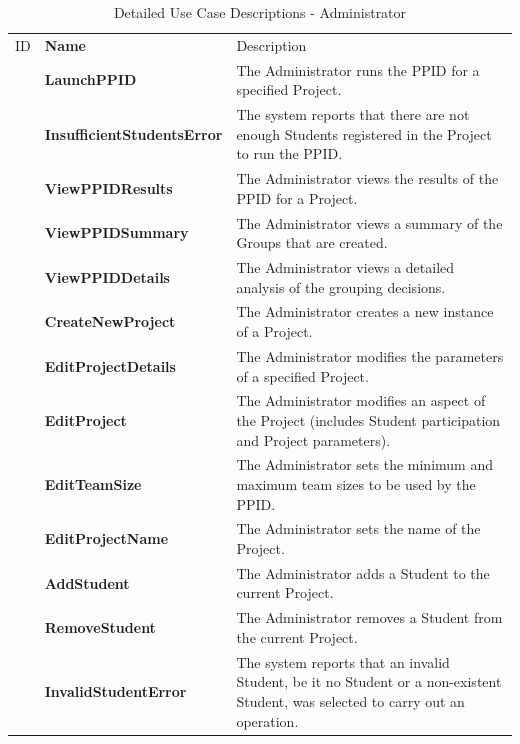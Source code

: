 \documentclass[12pt,letterpaper]{article}
\begin{document}
\begin{table}[H]
	\caption{Detailed Use Case Descriptions - Administrator}
	\vspace{1em}
	\begin{tabu} to 
	    \tableheader{}ID & Name & Description\\
		& LaunchPPID & The Administrator runs the PPID for a specified Project.\\
		& InsufficientStudentsError & The system reports that there are not enough Students registered in the Project to run the PPID.\\
		& ViewPPIDResults & The Administrator views the results of the PPID for a Project.\\
		& ViewPPIDSummary & The Administrator views a summary of the Groups that are created.\\
		& ViewPPIDDetails & The Administrator views a detailed analysis of the grouping decisions.\\
		& CreateNewProject & The Administrator creates a new instance of a Project.\\
		& EditProjectDetails & The Administrator modifies the parameters of a specified Project.\\
		& EditProject & The Administrator modifies an aspect of the Project (includes Student participation and Project parameters).\\
		& EditTeamSize & The Administrator sets the minimum and maximum team sizes to be used by the PPID.\\
		& EditProjectName & The Administrator sets the name of the Project.\\
		& AddStudent & The Administrator adds a Student to the current Project.\\
		& RemoveStudent & The Administrator removes a Student from the current Project.\\
		& InvalidStudentError & The system reports that an invalid Student, be it no Student or a non-existent Student, was selected to carry out an operation.\\
	\end{tabu}
\end{table}
\end{document}
